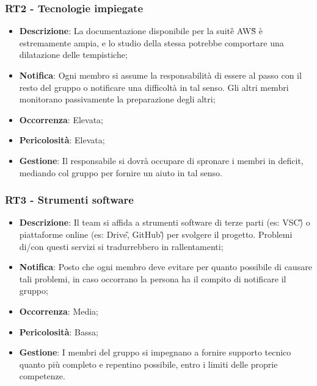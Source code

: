 	\subsubsection*{RT2 - Tecnologie impiegate}
	\begin{itemize}
		\item \textbf{Descrizione}: La documentazione disponibile per la suite\G{} AWS\G{} è estremamente ampia, e lo studio della stessa potrebbe comportare una dilatazione delle tempistiche;
		\item \textbf{Notifica}: Ogni membro si assume la responsabilità di essere al passo con il resto del gruppo o notificare una difficoltà in tal senso. Gli altri membri monitorano passivamente la preparazione degli altri;
		\item \textbf{Occorrenza}: Elevata;
		\item \textbf{Pericolosità}: Elevata;
		\item \textbf{Gestione}: Il responsabile si dovrà occupare di spronare i membri in deficit, mediando col gruppo per fornire un aiuto in tal senso.
	\end{itemize}

   \subsubsection*{RT3 - Strumenti software}
   \begin{itemize}
   	\item \textbf{Descrizione}: Il team si affida a strumenti software di terze parti (es: VSC\G) o piattaforme online (es: Drive\G, GitHub\G) per svolgere il progetto. Problemi di/con questi servizi si tradurrebbero in rallentamenti;
   	\item \textbf{Notifica}: Posto che ogni membro deve evitare per quanto possibile di causare tali problemi, in caso occorrano la persona ha il compito di notificare il gruppo;
   	\item \textbf{Occorrenza}: Media;
   	\item \textbf{Pericolosità}: Bassa;
   	\item \textbf{Gestione}: I membri del gruppo si impegnano a fornire supporto tecnico quanto più completo e repentino possibile, entro i limiti delle proprie competenze.
   \end{itemize}

